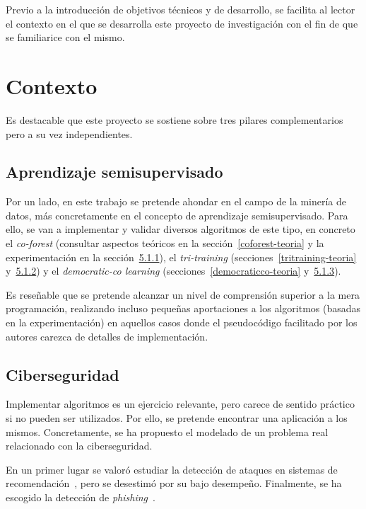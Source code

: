 
Previo a la introducción de objetivos técnicos y de desarrollo, se facilita al lector el contexto en el que se desarrolla este proyecto de investigación con el fin de que se familiarice con el mismo.

\section{Contexto}
\label{contexto}

Es destacable que este proyecto se sostiene sobre tres pilares complementarios pero a su vez independientes.

\subsection{Aprendizaje semisupervisado}

Por un lado, en este trabajo se pretende ahondar en el campo de la minería de datos, más concretamente en el concepto de aprendizaje semisupervisado. Para ello, se van a implementar y validar diversos algoritmos de este tipo, en concreto el \textit{co-forest} (consultar aspectos teóricos en la sección~\ref{coforest-teoria} y la experimentación en la sección~\hyperref[coforest-exp]{5.1.1}), el \textit{tri-training} (secciones~\ref{tritraining-teoria} y~\hyperref[tritraining-exp]{5.1.2}) y el \textit{democratic-co learning} (secciones~\ref{democraticco-teoria} y~\hyperref[democraticco-exp]{5.1.3}).

Es reseñable que se pretende alcanzar un nivel de comprensión superior a la mera programación, realizando incluso pequeñas aportaciones a los algoritmos (basadas en la experimentación) en aquellos casos donde el pseudocódigo facilitado por los autores carezca de detalles de implementación.

\subsection{Ciberseguridad}

Implementar algoritmos es un ejercicio relevante, pero carece de sentido práctico si no pueden ser utilizados. Por ello, se pretende encontrar una aplicación a los mismos. Concretamente, se ha propuesto el modelado de un problema real relacionado con la ciberseguridad.

En un primer lugar se valoró estudiar la detección de ataques en sistemas de recomendación~\cite{zhou2021SemisupervisedRecommendationAttack}, pero se desestimó por su bajo desempeño. Finalmente, se ha escogido la detección de \textit{phishing}~\cite{featuresPhishing2018Gupta}. 

